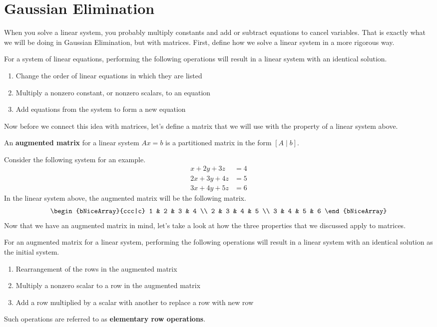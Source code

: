 \documentclass[../../../main.tex]{subfiles}
\begin{document}
\section{Gaussian Elimination}

When you solve a linear system, you probably multiply constants
and add or subtract equations to cancel variables. That is exactly
what we will be doing in Gaussian Elimination, but with matrices.
First, define how we solve a linear system in a more rigorous way.

\begin{definition}{}{}
For a system of linear equations, performing the following operations
will result in a linear system with an identical solution.
\begin{enumerate}[noitemsep]
\item
Change the order of linear equations in which they are listed
\item
Multiply a nonzero constant, or nonzero scalars, to an equation
\item
Add equations from the system to form a new equation
\end{enumerate}
\end{definition}

Now before we connect this idea with matrices, let's define a matrix
that we will use with the property of a linear system above.

\begin{definition}{}{}
An \textbf{augmented matrix} for a linear system $Ax = b$ is a
partitioned matrix in the form $[A \mid b]$.
\end{definition}

Consider the following system for an example.
\begin{align*}
    x + 2y + 3z &= 4 \\
    2x + 3y + 4z &= 5 \\
    3x + 4y + 5z &= 6
\end{align*}
In the linear system above, the augmented matrix will be the following
matrix.
\[
\begin{bNiceArray}{ccc|c}
    1 & 2 & 3 & 4 \\
    2 & 3 & 4 & 5 \\
    3 & 4 & 5 & 6
\end{bNiceArray}
\]
Now that we have an augmented matrix in mind, let's take a look at
how the three properties that we discussed apply to matrices.

\begin{definition}{}{}
For an augmented matrix for a linear system, performing the following
operations will result in a linear system with an identical solution
as the initial system.
\begin{enumerate}[noitemsep]
\item[$R_1$.]
Rearrangement of the rows in the augmented matrix
\item[$R_2$.]
Multiply a nonzero scalar to a row in the augmented matrix
\item[$R_3$.]
Add a row multiplied by a scalar with another to replace a row with
new row
\end{enumerate}
Such operations are referred to as \textbf{elementary row operations}.
\end{definition}
\end{document}
